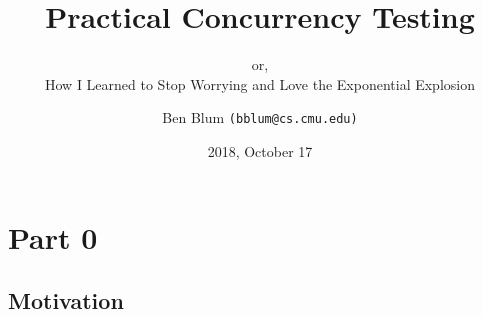 \documentclass[xcolor=dvipsnames]{beamer}
\title[]{{\bf Practical Concurrency Testing}}
\subtitle[]{or, \\ How I Learned to Stop Worrying and Love the Exponential Explosion}
\author[]{Ben Blum \texttt{(bblum@cs.cmu.edu)}}
\institute[]{Carnegie Mellon University}
\date[]{2018, October 17}
\begin{document}
\renewcommand{\inserttotalframenumber}{39}
\normalem
\begin{frame}
	\titlepage
\end{frame}


\newcommand\linegap{\vspace{0.2in}}
\newcommand\breakslide[1]{\begin{frame}{} \begin{center} #1 \end{center} \end{frame}}

\section{Part 0}
\subsection{Motivation}
\end{document}
